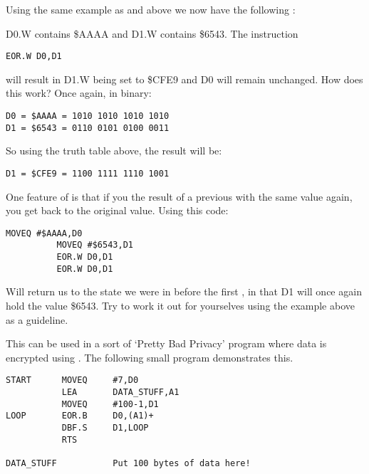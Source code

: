 Using the same example as  and  above we now have the following
   :

D0.W contains \$AAAA and D1.W contains \$6543. The instruction

\begin{lstlisting}[firstnumber=1,]
          EOR.W D0,D1
\end{lstlisting}

will result in D1.W being set to \$CFE9 and D0 will remain unchanged.
    How does this work? Once again, in binary:

\begin{lstlisting}[firstnumber=1,frame=none,numbers=none]
D0 = $AAAA = 1010 1010 1010 1010
D1 = $6543 = 0110 0101 0100 0011
\end{lstlisting}

So using the truth table above, the result will be:

\begin{lstlisting}[firstnumber=1,frame=none,numbers=none]
D1 = $CFE9 = 1100 1111 1110 1001
\end{lstlisting}

One feature of  is that if you  the result of a previous  with the same value again, you get back to the original value. Using this
    code:

\begin{lstlisting}[firstnumber=1,]
          MOVEQ #$AAAA,D0
          MOVEQ #$6543,D1
          EOR.W D0,D1
          EOR.W D0,D1
\end{lstlisting}

Will return us to the state we were in before the first , in that
    D1 will once again hold the value \$6543. Try to work it out for yourselves
    using the example above as a guideline.

This can be used in a sort of `Pretty Bad Privacy' program where
    data is encrypted using . The following small program demonstrates
    this.

\begin{lstlisting}[firstnumber=1,caption={Pretty Bad Privacy Example},label={lst:PrettyBadPrivacy}]
START      MOVEQ     #7,D0
           LEA       DATA_STUFF,A1 
           MOVEQ     #100-1,D1
LOOP       EOR.B     D0,(A1)+
           DBF.S     D1,LOOP
           RTS

DATA_STUFF           Put 100 bytes of data here!
\end{lstlisting}

